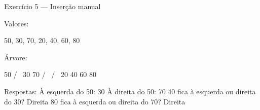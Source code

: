 Exercício 5 — Inserção manual

Valores:

50, 30, 70, 20, 40, 60, 80

Árvore:

          50
        /    \
      30      70
     /  \    /  \
   20   40  60   80

Respostas:
À esquerda do 50: 30
À direita do 50: 70
40 fica à esquerda ou direita do 30? Direita
80 fica à esquerda ou direita do 70? Direita